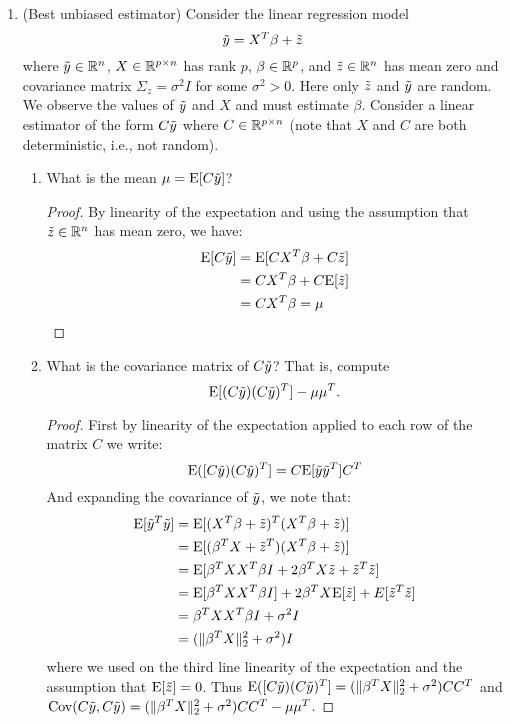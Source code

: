\documentclass[12pt,twoside]{article}
\begin{document}
\begin{enumerate}
\item (Best unbiased estimator) Consider the linear regression model
  $$\tilde{  y } = X^T\beta + \tilde{  z }$$
  where $\tilde{  y }\in\mathbb{R}^n$, $X\in\mathbb{R}^{p \times n}$ has rank $p$,
  $\beta\in\mathbb{R}^p$, and $\tilde{  z }\in\mathbb{R}^n$ has mean
  zero and covariance matrix $\Sigma_{z}=\sigma^2I$ for some
  $\sigma^2>0$.  Here only $\tilde{  z }$ and $\tilde{  y }$ are random.  We observe
  the values of $\tilde{  y }$ and $X$ and must estimate $\beta$.
  Consider a linear estimator of the form $C\tilde{  y }$
  where $C\in\mathbb{R}^{p\times n}$ (note that $X$ and $C$ are both
  deterministic, i.e., not random).
  \begin{enumerate}
  \item What is the mean $\mu=\mathrm{E}[C\tilde{  y }]$?

\begin{proof}
  
  	By linearity of the expectation and using the assumption that  $\tilde{  z }\in\mathbb{R}^n$ has mean
  zero, we have:
  	\begin{align*}
		\mathrm{E}[C\tilde{  y }]	&=	\mathrm{E}[C X^T \beta + C \tilde{  z }]	\\
				&= 	C X^T \beta  + C \mathrm{E}[\tilde{  z }]	\\
				&=	C X^T \beta = \mu
	\end{align*}
  \end{proof}  
  
  
  \item What is the covariance matrix of $C\tilde{  y }$? That is, compute
    $$\mathrm{E}[(C\tilde{  y })(C\tilde{  y })^T]-\mu\mu^T.$$

\begin{proof}
 	First by linearity of the expectation applied to each row of the matrix $C$ we write:
	$$\mathrm{E}([C \tilde{  y }) (C\tilde{  y })^T] = C \mathrm{E}[\tilde{  y } \tilde{  y }^T] C^T$$
	And expanding the covariance of $\tilde{  y }$, we note that:
  	\begin{align*}
		 \mathrm{E}[\tilde{  y }^T \tilde{  y }] 	&= 	\mathrm{E}[(X^T\beta + \tilde{  z })^T (X^T\beta + \tilde{  z })] \\
		 			&=	\mathrm{E}[(\beta^T X + \tilde{  z }^T) (X^T\beta + \tilde{  z })] \\
					&=	\mathrm{E}[\beta^T X X^T \beta I + 2 \beta^T X \tilde{  z } + \tilde{  z }^T \tilde{  z }] \\
					&=	\mathrm{E}[\beta^T X X^T \beta I] + 2 \beta^T X \mathrm{E}[\tilde{  z }] + E[\tilde{  z }^T \tilde{  z }] \\
					&=	\beta^T X X^T \beta I + \sigma^2 I \\
					&= 	(\|\beta^T X\|_2^2 + \sigma^2) I
	\end{align*}
	where we used on the third line linearity of the expectation and the assumption that $\mathrm{E}[\tilde{  z }]=0$.
	Thus $\mathrm{E}([C \tilde{  y }) (C\tilde{  y })^T] = (\|\beta^T X\|_2^2 + \sigma^2) C C^T$ and $\mathrm{Cov}(C\tilde{  y }, C\tilde{  y }) =  (\|\beta^T X\|_2^2 + \sigma^2) C C^T - \mu\mu^T$.
\end{proof}  	    
    

\end{enumerate}
\end{enumerate}
\end{document}
